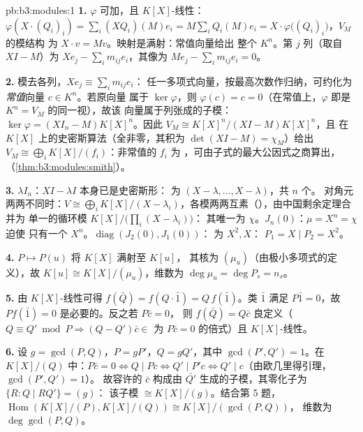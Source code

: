 \begin{solution}{pb:b3:modules:1}
\textbf{1.} $\varphi$ 可加，且 $K[X]$-线性：$\varphi(X
\cdot (Q_i)_i) = \sum_i (XQ_i)(M)e_i = M\sum_i Q_i(M)e_i = X
\cdot \varphi\bigl((Q_i)_i\bigr)$，$V_M$ 的模结构
为 $X \cdot v = Mv$。映射是满射：常值向量给出
整个 $K^n$。第 $j$ 列（取自 $XI - M$）为 $Xe_j - \sum_i
m_{ij}e_i$，其像为 $Me_j - \sum_i m_{ij}e_i = 0$。

\textbf{2.} 模去各列，$Xe_j \equiv \sum_i m_{ij}e_i$：
任一多项式向量，按最高次数作归纳，可约化为
\emph{常值}向量 $c \in K^n$。若原向量
属于 $\ker\varphi$，则 $\varphi(c) = c = 0$（在常值上，$\varphi$ 即是
$K^n = V_M$ 的同一视），故该
向量属于列张成的子模：$\ker\varphi = (XI_n -
M)K[X]^n$。因此 $V_M \cong K[X]^n/(XI - M)K[X]^n$，且
在 $K[X]$ 上的史密斯算法（全非零，其积为
$\det(XI - M) = \chi_M$）给出 $V_M \cong \bigoplus_i
K[X]/(f_i)$：非常值的 $f_i$ 为
，可由子式的最大公因式之商算出，
（\cref{thm:b3:modules:smith}）。

\textbf{3.} $\lambda I_n$：$XI - \lambda I$ 本身已是史密斯形：
为 $(X - \lambda, \dots, X - \lambda)$，共 $n$ 个。
对角元两两不同时：$V \cong \bigoplus_i K[X]/(X -
\lambda_i)$，各模两两互素（），由中国剩余定理合并为
单一的循环模 $K[X]/\bigl(\prod_i(X - \lambda_i)\bigr)$：
其唯一为 $\chi$。$J_n(0)$：$\mu = X^n = \chi$ 迫使
只有一个 $X^n$。$\operatorname{diag}(J_2(0), J_1(0))$：
为 $X^2, X$： $P_1 = X \mid P_2 =
X^2$。

\textbf{4.} $P \mapsto P(u)$ 将 $K[X]$ 满射至 $K[u]$，
其核为 $(\mu_u)$（由极小多项式的定义），故 $K[u]
\cong K[X]/(\mu_u)$，维数为 $\deg\mu_u = \deg P_s = n_s$。

\textbf{5.} 由 $K[X]$-线性可得 $f(\bar Q) = f(Q\cdot\bar 1)
= Q\,f(\bar 1)$。类 $\bar 1$ 满足 $P \bar 1 = 0$，故
$P f(\bar 1) = 0$ 是必要的。反之若 $P\bar c = 0$，
则 $f(\bar Q) = Q\bar c$ 良定义（$Q \equiv Q' \bmod P
\Rightarrow (Q - Q')\bar c \in$ 为 $P\bar c = 0$ 的倍式）且
$K[X]$-线性。

\textbf{6.} 设 $g = \gcd(P, Q)$，$P = gP'$，$Q = gQ'$，其中
$\gcd(P', Q') = 1$。在 $K[X]/(Q)$ 中：$P\bar c = 0 \iff Q \mid Pc
\iff Q' \mid P'c \iff Q' \mid c$（由欧几里得引理，$\gcd(P', Q') = 1$）。
故容许的 $\bar c$ 构成由
$\bar{Q'}$ 生成的子模，其零化子为 $\{R : Q \mid RQ'\} = (g)$：
该子模 $\cong K[X]/(g)$。结合第 5 题，
$\operatorname{Hom}(K[X]/(P), K[X]/(Q)) \cong K[X]/(\gcd(P,Q))$，
维数为 $\deg\gcd(P,Q)$。


\end{solution}
